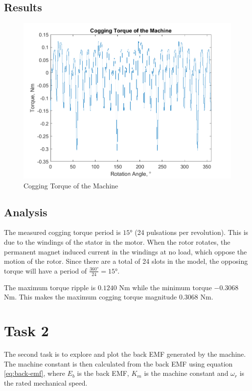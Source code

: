 \documentclass[12pt]{article}
\begin{document}
\subsection{Results}

\begin{figure}[H]
    \centering
    \includegraphics[width=\linewidth]{img/task_1.png}
    \caption{Cogging Torque of the Machine}
    \label{fig:task-1}
\end{figure}

\subsection{Analysis}

The measured cogging torque period is $\ang{15}$ (24 pulsations per revolution). This is due to the windings of the stator in the motor. When the rotor rotates, the permanent magnet induced current in the windings at no load, which oppose the motion of the rotor. Since there are a total of 24 slots in the model, the opposing torque will have a period of $\frac{\ang{360}}{24} = \ang{15}$.

The maximum torque ripple is $0.1240$ Nm while the minimum torque $-0.3068$ Nm. This makes the maximum cogging torque magnitude $0.3068$ Nm.

\section{Task 2}

The second task is to explore and plot the back EMF generated by the machine. The machine constant is then calculated from the back EMF using equation \ref{eq:back-emf}, where $E_{b}$ is the back EMF, $K_{m}$ is the machine constant and $\omega_{r}$ is the rated mechanical speed.
\end{document}
